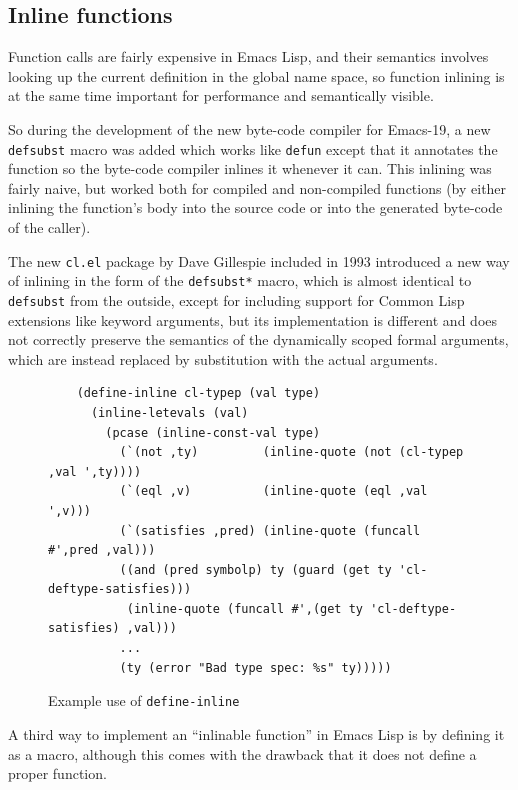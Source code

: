 \documentclass[format=acmsmall, review]{acmart}
\newcommand \Elisp {Emacs Lisp}
\begin{document}
\subsection{Inline functions}
\label{sec:inline-functions}

Function calls are fairly expensive in \Elisp{}, and their semantics
involves looking up the current definition in the global name space, so
function inlining is at the same time important for performance and
semantically visible.

So during the development of the new byte-code compiler for Emacs-19, a new
\texttt{defsubst} macro was added which works like \texttt{defun} except
that it annotates the function so the byte-code compiler inlines it whenever it
can.  This inlining was fairly naive, but worked both for compiled and
non-compiled functions (by either inlining the function's body into the
source code or into the generated byte-code of the caller).

The new \texttt{cl.el} package by Dave Gillespie included in 1993 introduced
a new way of inlining in the form of the \texttt{defsubst*} macro, which is
almost identical to \texttt{defsubst} from the outside, except for including
support for Common Lisp extensions like keyword arguments, but its
implementation is different and does not correctly preserve the semantics of
the dynamically scoped formal arguments, which are instead replaced by
substitution with the actual arguments.

\begin{figure}
\begin{verbatim}
    (define-inline cl-typep (val type)
      (inline-letevals (val)
        (pcase (inline-const-val type)
          (`(not ,ty)         (inline-quote (not (cl-typep ,val ',ty))))
          (`(eql ,v)          (inline-quote (eql ,val ',v)))
          (`(satisfies ,pred) (inline-quote (funcall #',pred ,val)))
          ((and (pred symbolp) ty (guard (get ty 'cl-deftype-satisfies)))
           (inline-quote (funcall #',(get ty 'cl-deftype-satisfies) ,val)))
          ...
          (ty (error "Bad type spec: %s" ty)))))
\end{verbatim}
  \caption{Example use of \texttt{define-inline}}
  \label{fig:define-inline}
\end{figure}

A third way to implement an ``inlinable function'' in \Elisp{} is by
defining it as a macro, although this comes with the drawback that it does
not define a proper function.
\end{document}

